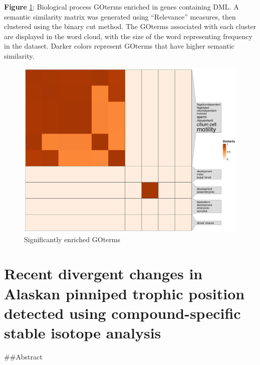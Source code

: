 \documentclass [11pt, proquest] {uwthesis}[2015/03/03]
\begin{document}
\textbf{Figure} \ref{fig:simplifyEnrichment}: Biological process GOterms enriched in genes containing DML. A semantic similarity matrix was generated using ``Relevance'' measures, then clustered using the binary cut method. The GOterms associated with each cluster are displayed in the word cloud, with the size of the word representing frequency in the dataset. Darker colors represent GOterms that have higher semantic similarity.\newline 
\begin{figure}[h]
\centering
  \includegraphics[width=1\textwidth]{figure/Ch3/Figure3.5.pdf}
  \caption{Significantly enriched GOterms}
  \label{fig:simplifyEnrichment}
\end{figure}
\clearpage

\hypertarget{recent-divergent-changes-in-alaskan-pinniped-trophic-position-detected-using-compound-specific-stable-isotope-analysis}{%
\chapter{Recent divergent changes in Alaskan pinniped trophic position detected using compound-specific stable isotope analysis}\label{recent-divergent-changes-in-alaskan-pinniped-trophic-position-detected-using-compound-specific-stable-isotope-analysis}}

\#\#Abstract
\end{document}
